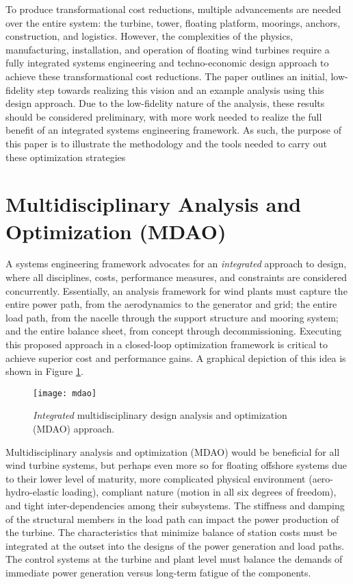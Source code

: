 To produce transformational cost reductions, multiple advancements are
needed over the entire system: the turbine, tower, floating platform,
moorings, anchors, construction, and logistics.  However, the
complexities of the physics, manufacturing, installation, and operation
of floating wind turbines require a fully integrated systems engineering
and techno-economic design approach to achieve these transformational
cost reductions.  The paper outlines an initial, low-fidelity step
towards realizing this vision and an example analysis using this design
approach.  Due to the low-fidelity nature of the analysis, these results
should be considered preliminary, with more work needed to realize the
full benefit of an integrated systems engineering framework.  As such,
the purpose of this paper is to illustrate the methodology and the tools
needed to carry out these optimization strategies

\section{Multidisciplinary Analysis and Optimization (MDAO)}
A systems engineering framework advocates for an \textit{integrated}
approach to design, where all disciplines, costs, performance measures,
and constraints are considered concurrently.  Essentially, an analysis
framework for wind plants must capture the entire power path, from the
aerodynamics to the generator and grid; the entire load path, from the
nacelle through the support structure and mooring system; and the entire
balance sheet, from concept through decommissioning.  Executing this
proposed approach in a closed-loop optimization framework is critical to
achieve superior cost and performance gains.  A graphical depiction of
this idea is shown in Figure \ref{fig:mdao}.

\begin{figure}[htbp]
  \begin{center}
    \texttt{[image: mdao]}
  \caption{\textit{Integrated} multidisciplinary design analysis and optimization
    (MDAO) approach.}
  \label{fig:mdao}
  \end{center}
\end{figure}

Multidisciplinary analysis and optimization (MDAO) would be beneficial
for all wind turbine systems, but perhaps even more so for floating
offshore systems due to their lower level of maturity, more complicated
physical environment (aero-hydro-elastic loading), compliant nature
(motion in all six degrees of freedom), and tight inter-dependencies
among their subsystems. The stiffness and damping of the structural
members in the load path can impact the power production of the
turbine. The characteristics that minimize balance of station costs must
be integrated at the outset into the designs of the power generation and
load paths. The control systems at the turbine and plant level must
balance the demands of immediate power generation versus long-term
fatigue of the components.

